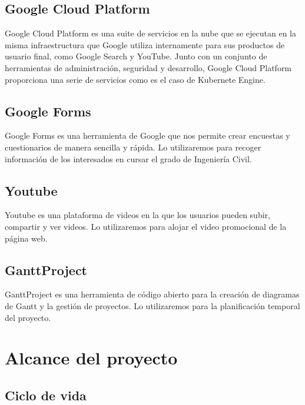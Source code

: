 \documentclass{report}
\begin{document}
        \section*{Google Cloud Platform}
            Google Cloud Platform es una suite de servicios en la nube que se ejecutan en la misma infraestructura que Google utiliza internamente para sus productos de usuario final, como Google Search y YouTube. Junto con un conjunto de herramientas de administración, seguridad y desarrollo, Google Cloud Platform proporciona una serie de servicios como es el caso de Kubernete Engine.
        \section*{Google Forms}
            Google Forms es una herramienta de Google que nos permite crear encuestas y cuestionarios de manera sencilla y rápida. Lo utilizaremos para recoger información de los interesados en cursar el grado de Ingeniería Civil.
        \section*{Youtube}
            Youtube es una plataforma de videos en la que los usuarios pueden subir, compartir y ver videos. Lo utilizaremos para alojar el video promocional de la página web.
        \section*{GanttProject}
            GanttProject es una herramienta de código abierto para la creación de diagramas de Gantt y la gestión de proyectos. Lo utilizaremos para la planificación temporal del proyecto.
    \chapter{Alcance del proyecto}
        \section{Ciclo de vida}
\end{document}
